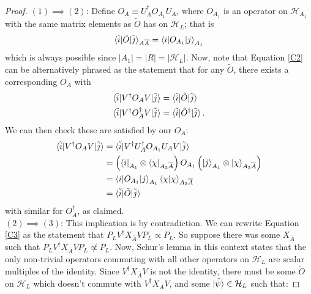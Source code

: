 \documentclass[12pt,a4paper]{report}
\numberwithin{equation}{section}
\newcommand{\ol}[1]{\overline{#1}}
\theoremstyle{definition}
\theoremstyle{theorem}
\theoremstyle{theorem}
\theoremstyle{example}
\theoremstyle{definition}
\begin{document}
\newcommand{\Xabar}{X_{\overline{A}}}
\begin{proof}
	$(1)\implies(2)$: Define $O_{A}\equiv U_{A}^{\dagger}O_{A_{1}}U_{A}$, where $O_{A_{1}}$ is an operator on $\mathcal{H}_{A_{1}}$ with the same matrix elements as $\tilde{O}$ has on $\mathcal{H}_{L}$; that is
	\begin{equation*}
		\braket{\tilde{i}|\tilde{O}|\tilde{j}}_{A\ol{A}}=\braket{i|O_{A_{1}}|j}_{A_{1}}
	\end{equation*}
	which is always possible since $|A_{1}|=|R|=|\mathcal{H}_{L}|$. Now, note that Equation \ref{C2} can be alternatively phrased as the statement that for any $\tilde{O}$, there exists a corresponding $O_{A}$ with
	\begin{equation}
		\begin{aligned}
			\braket{\tilde{i}|V^{\dagger}O_{A}V|\tilde{j}}&=\braket{\tilde{i}|\tilde{O}|\tilde{j}}\\
			\braket{\tilde{i}|V^{\dagger}O_{A}^{\dagger}V|\tilde{j}}&=\braket{\tilde{i}|\tilde{O}^{\dagger}|\tilde{j}}.
		\end{aligned}
	\end{equation}
	We can then check these are satisfied by our $O_{A}$:
	\begin{equation}
		\begin{aligned}
			\braket{\tilde{i}|V^{\dagger}O_{A}V|\tilde{j}}&=\braket{\tilde{i}|V^{\dagger}U_{A}^{\dagger}O_{A_{1}}U_{A}V|\tilde{j}}\\&=\left(\bra{i}_{A_{1}}\otimes\bra{\chi}_{A_{2}\ol{A}}\right)O_{A_{1}}\left(\ket{j}_{A_{1}}\otimes\ket{\chi}_{A_{2}\ol{A}}\right)\\&=\braket{i|O_{A_{1}}|j}_{A_{1}}\braket{\chi|\chi}_{A_{2}\ol{A}}\\&=\braket{\tilde{i}|\tilde{O}|\tilde{j}}
		\end{aligned}
	\end{equation}
	with similar for $O_{A}^{\dagger}$, as claimed.\\
	$(2)\implies(3)$: This implication is by contradiction. We can rewrite Equation \ref{C3} as the statement that $P_{L}V^{\dagger}\Xabar VP_{L}\propto P_{L}$. So suppose there was some $X_{\ol{A}}$ such that $P_{L}V^{\dagger} X_{\ol{A}}VP_{L} \not\propto P_{L}$. Now, Schur's lemma in this context states that the only non-trivial operators commuting with all other operators on $\mathcal{H}_{L}$ are scalar multiples of the identity. Since $V^{\dagger}X_{\ol{A}}V$ is not the identity, there must be some $\tilde{O}$ on $\mathcal{H}_{L}$ which doesn't commute with $V^{\dagger}X_{\ol{A}}V$, and some $\ket{\tilde{\psi}}\in\mathcal{H}_{L}$ such that:

\end{proof}
\end{document}
